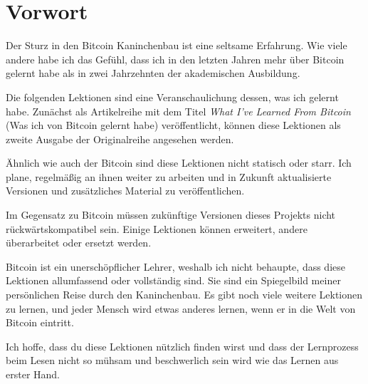 \chapter*{Vorwort}
Der Sturz in den Bitcoin Kaninchenbau ist eine seltsame Erfahrung. Wie viele
andere habe ich das Gefühl, dass ich in den letzten Jahren mehr über Bitcoin
gelernt habe als in zwei Jahrzehnten der akademischen Ausbildung.

Die folgenden Lektionen sind eine Veranschaulichung dessen, was ich gelernt
habe. Zunächst als Artikelreihe mit dem Titel \textit{What I’ve Learned From
Bitcoin} (Was ich von Bitcoin gelernt habe) veröffentlicht, können diese
Lektionen als zweite Ausgabe der Originalreihe angesehen werden.

Ähnlich wie auch der Bitcoin sind diese Lektionen nicht statisch oder starr. Ich
plane, regelmäßig an ihnen weiter zu arbeiten und in Zukunft aktualisierte
Versionen und zusätzliches Material zu veröffentlichen.

Im Gegensatz zu Bitcoin müssen zukünftige Versionen dieses Projekts nicht
rückwärtskompatibel sein. Einige Lektionen können erweitert, andere überarbeitet
oder ersetzt werden.

Bitcoin ist ein unerschöpflicher Lehrer, weshalb ich nicht behaupte, dass diese
Lektionen allumfassend oder vollständig sind. Sie sind ein Spiegelbild meiner
persönlichen Reise durch den Kaninchenbau. Es gibt noch viele weitere Lektionen
zu lernen, und jeder Mensch wird etwas anderes lernen, wenn er in die Welt von
Bitcoin eintritt.

Ich hoffe, dass du diese Lektionen nützlich finden wirst und dass der
Lernprozess beim Lesen nicht so mühsam und beschwerlich sein wird wie das Lernen
aus erster Hand.

%
%
